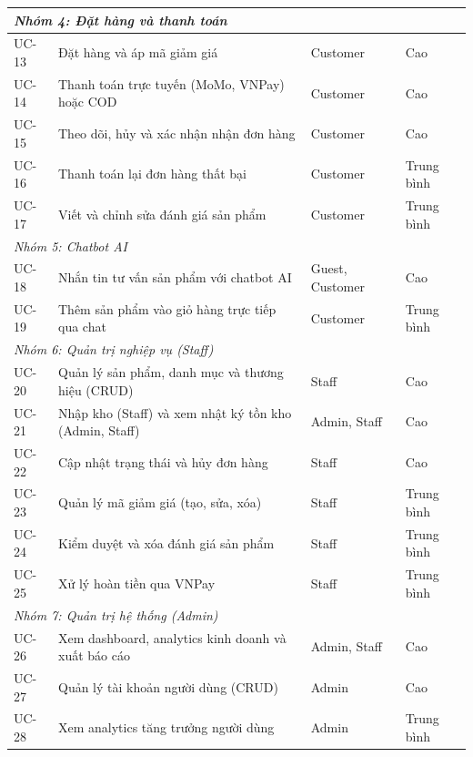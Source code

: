 \begin{longtable}{|l|p{6cm}|p{3.5cm}|l|}
  \multicolumn{4}{|l|}{\textit{Nhóm 4: Đặt hàng và thanh toán}} \\
  \hline
  UC-13 & Đặt hàng và áp mã giảm giá & Customer & Cao \\
  \hline
  UC-14 & Thanh toán trực tuyến (MoMo, VNPay) hoặc COD & Customer & Cao \\
  \hline
  UC-15 & Theo dõi, hủy và xác nhận nhận đơn hàng & Customer & Cao \\
  \hline
  UC-16 & Thanh toán lại đơn hàng thất bại & Customer & Trung bình \\
  \hline
  UC-17 & Viết và chỉnh sửa đánh giá sản phẩm & Customer & Trung bình \\
  \hline

  \multicolumn{4}{|l|}{\textit{Nhóm 5: Chatbot AI}} \\
  \hline
  UC-18 & Nhắn tin tư vấn sản phẩm với chatbot AI & Guest, Customer & Cao \\
  \hline
  UC-19 & Thêm sản phẩm vào giỏ hàng trực tiếp qua chat & Customer & Trung bình \\
  \hline

  \multicolumn{4}{|l|}{\textit{Nhóm 6: Quản trị nghiệp vụ (Staff)}} \\
  \hline
  UC-20 & Quản lý sản phẩm, danh mục và thương hiệu (CRUD) & Staff & Cao \\
  \hline
  UC-21 & Nhập kho (Staff) và xem nhật ký tồn kho (Admin, Staff) & Admin, Staff & Cao \\
  \hline
  UC-22 & Cập nhật trạng thái và hủy đơn hàng & Staff & Cao \\
  \hline
  UC-23 & Quản lý mã giảm giá (tạo, sửa, xóa) & Staff & Trung bình \\
  \hline
  UC-24 & Kiểm duyệt và xóa đánh giá sản phẩm & Staff & Trung bình \\
  \hline
  UC-25 & Xử lý hoàn tiền qua VNPay & Staff & Trung bình \\
  \hline

  \multicolumn{4}{|l|}{\textit{Nhóm 7: Quản trị hệ thống (Admin)}} \\
  \hline
  UC-26 & Xem dashboard, analytics kinh doanh và xuất báo cáo & Admin, Staff & Cao \\
  \hline
  UC-27 & Quản lý tài khoản người dùng (CRUD) & Admin & Cao \\
  \hline
  UC-28 & Xem analytics tăng trưởng người dùng & Admin & Trung bình \\
  \hline
\end{longtable}


